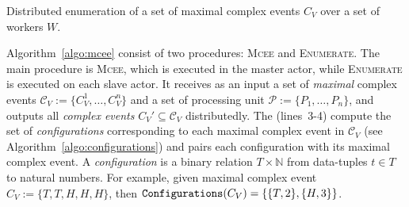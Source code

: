 \begin{algorithm}[H]
\caption{Distributed enumeration of a set of maximal complex events $C_{V}$ over a set of workers $W$.}
\label{algo:mcee}
\end{algorithm}

Algorithm~\ref{algo:mcee} consist of two procedures: \textsc{Mcee} and \textsc{Enumerate}. The main procedure is \textsc{Mcee}, which is executed in the master actor, while \textsc{Enumerate} is executed on each slave actor. It receives as an input a set of \emph{maximal} complex events $\mathcal{C}_{V} := \{C^{1}_{V}, \ldots, C^{n}_{V}\}$ and a set of processing unit $\mathcal{P} := \{P_{1},\ldots, P_{n}\}$, and outputs all \emph{complex events} $C_{V}' \subseteq \mathcal{C}_{V}$ distributedly. The  (lines~3-4) compute the set of \emph{configurations} corresponding to each maximal complex event in $\mathcal{C}_{V}$ (see Algorithm~\ref{algo:configurations}) and pairs each configuration with its maximal complex event. A \emph{configuration} is a binary relation $T \times \mathbb{N}$ from data-tuples $t \in T$ to natural numbers. For example, given maximal complex event $C_{V} := \{T, T, H, H, H\}$, then $\texttt{Configurations}(C_{V}) = \{ \{T, 2\}, \{H, 3\}\}$.


